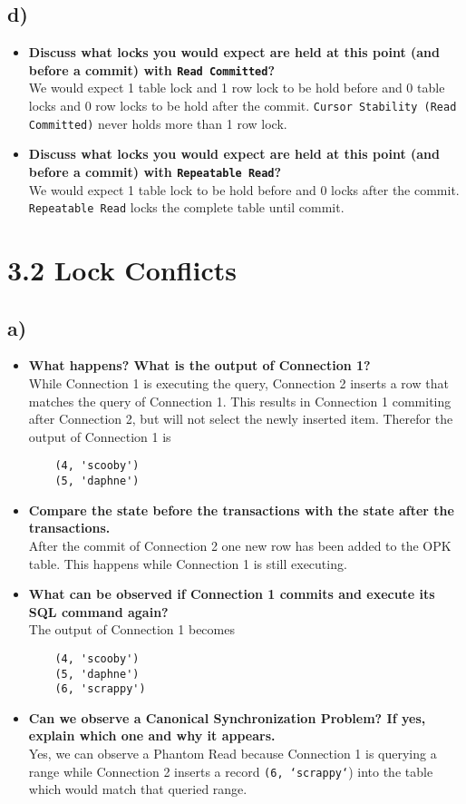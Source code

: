 \documentclass[a4paper,english,abstract=on]{scrartcl}
\begin{document}
\subsection*{d)}
\begin{itemize}
\item \textbf{Discuss what locks you would expect are held at this point (and before a commit) with \texttt{Read Committed}?}\\
We would expect 1 table lock and 1 row lock to be hold before and 0 table locks and 0 row locks to be hold after the commit. \texttt{Cursor Stability (Read Committed)} never holds more than 1 row lock.

\item \textbf{Discuss what locks you would expect are held at this point (and before a commit) with \texttt{Repeatable Read}?}\\
We would expect 1 table lock to be hold before and 0 locks after the commit. \texttt{Repeatable Read} locks the complete table until commit.
\end{itemize}

\section*{3.2 Lock Conflicts}
\subsection*{a)}
\begin{itemize}
	\item \textbf{What happens? What is the output of Connection 1?}\\
	While Connection 1 is executing the query, Connection 2 inserts a row that matches the query of Connection 1. This results in Connection 1 commiting after Connection 2, but will not select the newly inserted item. Therefor the output of Connection 1 is
	\begin{lstlisting}
	(4, 'scooby')
	(5, 'daphne')
	\end{lstlisting}
	\item \textbf{Compare the state before the transactions with the state after the transactions.}\\
	After the commit of Connection 2 one new row has been added to the OPK table. This happens while Connection 1 is still executing.
	\item \textbf{What can be observed if Connection 1 commits and execute its SQL command again?}\\
	The output of Connection 1 becomes
	\begin{lstlisting}
	(4, 'scooby')
	(5, 'daphne')
	(6, 'scrappy')
	\end{lstlisting}
	\item \textbf{Can we observe a Canonical Synchronization Problem? If yes, explain which one and why it appears.}\\
	Yes, we can observe a Phantom Read because Connection 1 is querying a range while Connection 2 inserts a record \texttt{(6, `scrappy`}) into the table which would match that queried range.
\end{itemize}
\end{document}
